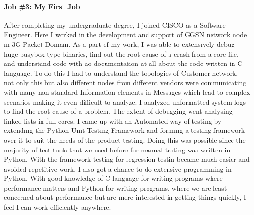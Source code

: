 \documentclass[letterpaper]{article}
\begin{document}
\paragraph{Job \#3: My First Job }
After completing my undergraduate degree, I joined CISCO as a Software Engineer.
Here I worked in the development and support of GGSN network node in 3G Packet Domain. 
As a part of my work, I was able to extensively debug huge busybox type binaries, 
find out the root cause of a crash from a core-file, and understand code with no documentation 
at all about the code written in C language. 
To do this I had to understand the topologies of Customer network, not only this 
but also different nodes from different vendors were communicating with many non-standard 
Information elements in Messages which lead to complex scenarios making it even difficult to analyze. 
I analyzed unformatted system logs to find the root cause of a problem. 
The extent of debugging went analysing linked lists in full cores. 
I came up with an Automated way of testing by extending the Python Unit Testing Framework and forming 
a testing framework over it to suit the needs of the product testing. 
Doing this was possible since the majority of test tools that we used before for manual testing was written in Python. 
With the framework testing for regression testin became much easier and avoided repetitive work. 
I also got a chance to do extensive programming in Python. 
With good knowledge of C-language for writing programs where performance matters and Python for writing programs, 
where we are least concerned about performance but are more interested in getting things quickly, 
I feel I can work efficiently anywhere. 

\pagebreak
\end{document}
